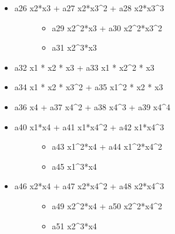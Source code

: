 \documentclass[letterpaper,10pt,english]{sphinxmanual}
\begin{document}
\begin{fulllineitems}
\begin{description}
\begin{itemize}
\item {} \begin{description}
\item[{a26 x2*x3 + a27 x2*x3\textasciicircum{}2 + a28  x2*x3\textasciicircum{}3}] \leavevmode\begin{itemize}
\item {} 
a29 x2\textasciicircum{}2*x3 + a30  x2\textasciicircum{}2*x3\textasciicircum{}2

\item {} 
a31 x2\textasciicircum{}3*x3

\end{itemize}

\end{description}

\item {} 
a32 x1 * x2 * x3 + a33 x1 * x2\textasciicircum{}2 * x3

\item {} 
a34 x1 * x2 * x3\textasciicircum{}2 + a35 x1\textasciicircum{}2 * x2 * x3

\item {} 
a36 x4 + a37 x4\textasciicircum{}2 + a38 x4\textasciicircum{}3 + a39 x4\textasciicircum{}4

\item {} \begin{description}
\item[{a40 x1*x4 + a41 x1*x4\textasciicircum{}2 + a42  x1*x4\textasciicircum{}3}] \leavevmode\begin{itemize}
\item {} 
a43 x1\textasciicircum{}2*x4 + a44  x1\textasciicircum{}2*x4\textasciicircum{}2

\item {} 
a45 x1\textasciicircum{}3*x4

\end{itemize}

\end{description}

\item {} \begin{description}
\item[{a46 x2*x4 + a47 x2*x4\textasciicircum{}2 + a48  x2*x4\textasciicircum{}3}] \leavevmode\begin{itemize}
\item {} 
a49 x2\textasciicircum{}2*x4 + a50  x2\textasciicircum{}2*x4\textasciicircum{}2

\item {} 
a51 x2\textasciicircum{}3*x4


\end{itemize}
\end{description}
\end{itemize}
\end{description}
\end{fulllineitems}
\end{document}
